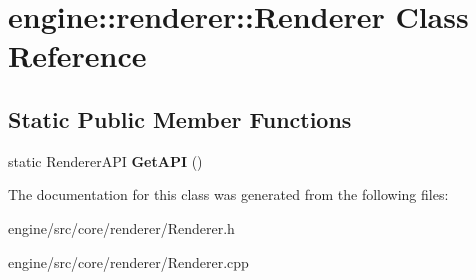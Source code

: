 \hypertarget{classengine_1_1renderer_1_1Renderer}{}\section{engine\+:\+:renderer\+:\+:Renderer Class Reference}
\label{classengine_1_1renderer_1_1Renderer}
\subsection*{Static Public Member Functions}
\begin{DoxyCompactItemize}
\item
\mbox{\label{classengine_1_1renderer_1_1Renderer_aa2fc6d152284fd3c4e66b5ecbf8ab586}}
static Renderer\+A\+PI {\bfseries Get\+A\+PI} ()
\end{DoxyCompactItemize}


The documentation for this class was generated from the following files\+:\begin{DoxyCompactItemize}
\item
engine/src/core/renderer/Renderer.\+h\item
engine/src/core/renderer/Renderer.\+cpp\end{DoxyCompactItemize}
